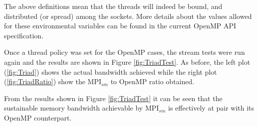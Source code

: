 The above definitions mean that the threads will indeed be bound, and distributed (or spread) among the sockets. More details about the values allowed for these environmental variables can be found in the current OpenMP API specification.

\medskip

Once a thread policy was set for the OpenMP cases, the stream tests were run again and the results are shown in Figure \ref{fig:TriadTest}. As before, the left plot (\ref{fig:Triad}) shows the actual bandwidth achieved while the right plot (\ref{fig:TriadRatio}) show the MPI$_{sm}$ to OpenMP ratio obtained. 

\medskip
From the results shown in Figure \ref{fig:TriadTest} it can be seen that the sustainable memory bandwidth achievable by MPI$_{sm}$ is effectively at pair with its OpenMP counterpart.


